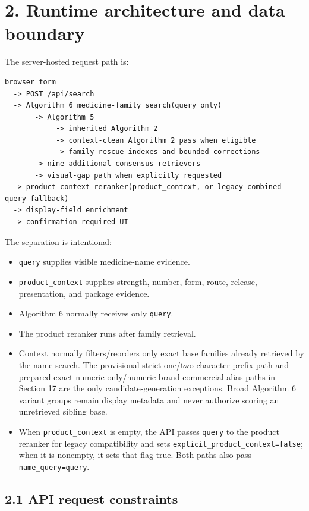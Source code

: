 \section{2. Runtime architecture and data boundary}\label{2-runtime-architecture-and-data-boundary}

The server-hosted request path is:

\begin{verbatim}
browser form
  -> POST /api/search
  -> Algorithm 6 medicine-family search(query only)
       -> Algorithm 5
            -> inherited Algorithm 2
            -> context-clean Algorithm 2 pass when eligible
            -> family rescue indexes and bounded corrections
       -> nine additional consensus retrievers
       -> visual-gap path when explicitly requested
  -> product-context reranker(product_context, or legacy combined query fallback)
  -> display-field enrichment
  -> confirmation-required UI
\end{verbatim}

The separation is intentional:

\begin{itemize}
\tightlist
\item
  \texttt{query} supplies visible medicine-name evidence.
\item
  \texttt{product\_\allowbreak{}context} supplies strength, number, form, route, release, presentation, and package evidence.
\item
  Algorithm 6 normally receives only \texttt{query}.
\item
  The product reranker runs after family retrieval.
\item
  Context normally filters/reorders only exact base families already retrieved by the name search. The provisional strict one/two-character prefix path and prepared exact numeric-only/numeric-brand commercial-alias paths in Section 17 are the only candidate-generation exceptions. Broad Algorithm 6 variant groups remain display metadata and never authorize scoring an unretrieved sibling base.
\item
  When \texttt{product\_\allowbreak{}context} is empty, the API passes \texttt{query} to the product reranker for legacy compatibility and sets \texttt{explicit\_\allowbreak{}product\_\allowbreak{}context=false}; when it is nonempty, it sets that flag true. Both paths also pass \texttt{name\_\allowbreak{}query=query}.
\end{itemize}

\subsection{2.1 API request constraints}\label{21-api-request-constraints}

